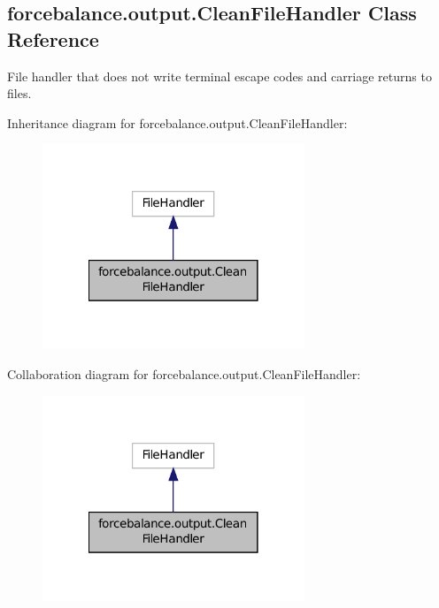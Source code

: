 \hypertarget{classforcebalance_1_1output_1_1CleanFileHandler}{\subsection{forcebalance.\-output.\-Clean\-File\-Handler Class Reference}
\label{classforcebalance_1_1output_1_1CleanFileHandler}
}


File handler that does not write terminal escape codes and carriage returns to files.  




Inheritance diagram for forcebalance.\-output.\-Clean\-File\-Handler\-:
\nopagebreak
\begin{figure}[H]
\begin{center}
\leavevmode
\includegraphics[width=222pt]{classforcebalance_1_1output_1_1CleanFileHandler__inherit__graph}
\end{center}
\end{figure}


Collaboration diagram for forcebalance.\-output.\-Clean\-File\-Handler\-:
\nopagebreak
\begin{figure}[H]
\begin{center}
\leavevmode
\includegraphics[width=222pt]{classforcebalance_1_1output_1_1CleanFileHandler__coll__graph}
\end{center}
\end{figure}
